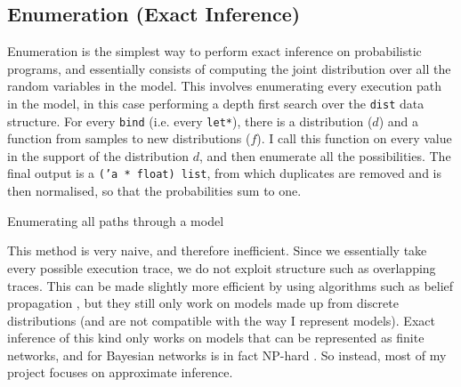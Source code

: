 \documentclass[sigconf]{acmart}
\begin{document}




\subsection{Enumeration (Exact Inference)} \label{sec:enum}
Enumeration is the simplest way to perform exact inference on probabilistic programs, and essentially consists of computing the joint distribution over all the random variables in the model. This involves enumerating every execution path in the model, in this case performing a depth first search over the \texttt{dist} data structure. For every \texttt{bind} (i.e. every \texttt{let*}), there is a distribution ($d$) and a function from samples to new distributions ($f$). I call this function on every value in the support of the distribution $d$, and then enumerate all the possibilities. The final output is a \texttt{('a * float) list}, from which duplicates are removed and is then normalised, so that the probabilities sum to one.

\begin{listing}[ht]
  \caption{Enumerating all paths through a model}
  \label{lst:enum}
\end{listing}

This method is very naive, and therefore inefficient. Since we essentially take every possible execution trace, we do not exploit structure such as overlapping traces. This can be made slightly more efficient by using algorithms such as belief propagation \cite{belief-prop}, but they still only work on models made up from discrete distributions (and are not compatible with the way I represent models). Exact inference of this kind only works on models that can be represented as finite networks, and for Bayesian networks is in fact NP-hard \cite{cooper1990computational}. So instead, most of my project focuses on approximate inference.
\end{document}
